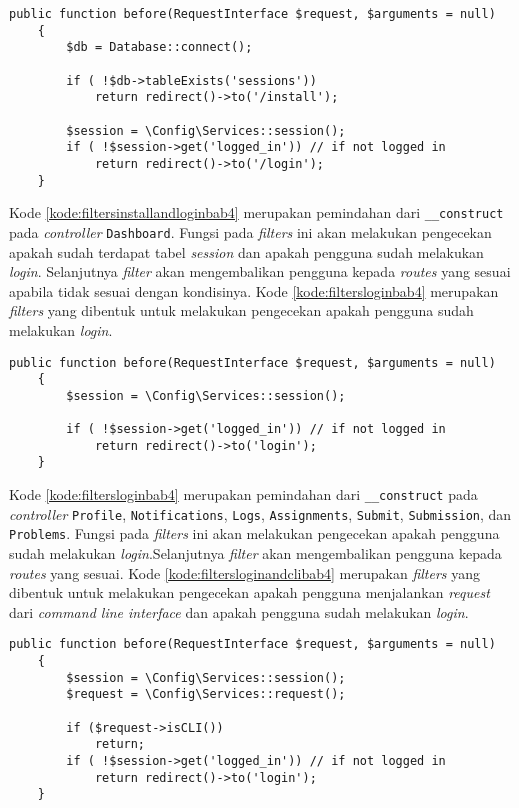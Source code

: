 \begin{lstlisting}[caption=Perancangan kode pada \textit{Filters} \texttt{CheckInstallAndLogin.php}, label=kode:filtersinstallandloginbab4]
	public function before(RequestInterface $request, $arguments = null)
    {   
        $db = Database::connect();

        if ( !$db->tableExists('sessions'))
			return redirect()->to('/install');
        
        $session = \Config\Services::session();
		if ( !$session->get('logged_in')) // if not logged in
			return redirect()->to('/login');
    }
\end{lstlisting}

Kode \ref{kode:filtersinstallandloginbab4} merupakan pemindahan dari \texttt{\_\_construct} pada \textit{controller} \texttt{Dashboard}. Fungsi pada \textit{filters} ini akan melakukan pengecekan apakah sudah terdapat tabel \textit{session} dan apakah pengguna sudah melakukan \textit{login}. Selanjutnya \textit{filter} akan mengembalikan pengguna kepada \textit{routes} yang sesuai apabila tidak sesuai dengan kondisinya. Kode \ref{kode:filtersloginbab4} merupakan \textit{filters} yang dibentuk untuk melakukan pengecekan apakah pengguna sudah melakukan \textit{login}.
\begin{lstlisting}[caption=Perancangan kode pada \textit{Filters} \texttt{CheckLogin.php}, label=kode:filtersloginbab4]
	public function before(RequestInterface $request, $arguments = null)
    {
        $session = \Config\Services::session();

        if ( !$session->get('logged_in')) // if not logged in
			return redirect()->to('login');
    }
\end{lstlisting}

Kode \ref{kode:filtersloginbab4} merupakan pemindahan dari \texttt{\_\_construct} pada \textit{controller} \texttt{Profile}, \texttt{Notifications}, \texttt{Logs}, \texttt{Assignments}, \texttt{Submit}, \texttt{Submission}, dan \texttt{Problems}. Fungsi pada \textit{filters} ini akan melakukan pengecekan apakah pengguna sudah melakukan \textit{login}.Selanjutnya \textit{filter} akan mengembalikan pengguna kepada \textit{routes} yang sesuai. Kode \ref{kode:filtersloginandclibab4} merupakan \textit{filters} yang dibentuk untuk melakukan pengecekan apakah pengguna menjalankan \textit{request} dari \textit{command line interface} dan apakah pengguna sudah melakukan \textit{login}.

\begin{lstlisting}[caption=Perancangan kode pada \textit{Filters} \texttt{CheckLoginandCLI.php}, label=kode:filtersloginandclibab4]
	public function before(RequestInterface $request, $arguments = null)
    {   
        $session = \Config\Services::session();
        $request = \Config\Services::request();

        if ($request->isCLI())
            return;
        if ( !$session->get('logged_in')) // if not logged in
            return redirect()->to('login');
    }
\end{lstlisting}

